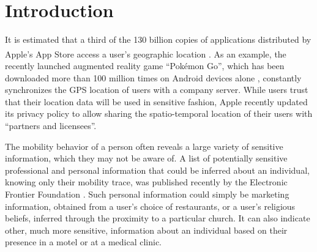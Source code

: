 
\chapter[Introduction]{Introduction}

It is estimated that a third of the 130 billion copies of applications distributed by Apple's App Store\textsuperscript{\textregistered} access a user's geographic location \cite{appledownloads,appslocation}. As an example, the recently launched augmented reality game ``Pok\'emon Go'', which has been downloaded more than 100 million times on Android devices alone \cite{pokemongo}, constantly synchronizes the GPS location of users with a company server. While users trust that their location data will be used in sensitive fashion, Apple\textregistered{} recently updated its privacy policy to allow sharing the spatio-temporal location of their users with ``partners and licensees''\cite{appleprivacy}.

The mobility behavior of a person often reveals a large variety of sensitive information, which they may not be aware of.
A list of potentially sensitive professional and personal information that could be inferred about an individual, knowing only their mobility trace, was published recently by the Electronic Frontier Foundation \cite{Blumberg2009}. Such personal information could simply be marketing information, obtained from a user's choice of restaurants, or a user's religious beliefs, inferred through the proximity to a particular church. It can also indicate other, much more sensitive, information about an individual based on their presence in a motel or at a medical clinic.

